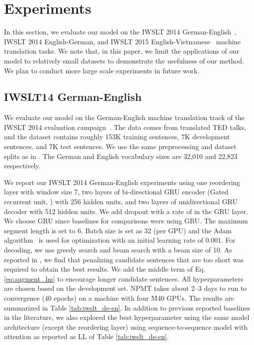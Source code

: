 \documentclass{article}
\begin{document}
\section{Experiments}
\label{sec:experiment}

In this section, we evaluate our model on the IWSLT 2014
German-English~\citep{cettolo2014report}, IWSLT 2014 English-German, and IWSLT 2015
English-Vietnamese~\citep{cettolo2015iwslt} machine translation tasks. We note that, in this paper, we
limit the applications of our model to relatively small datasets to demonstrate
the usefulness of our method. We plan to conduct more large scale experiments in
future work.


\subsection{IWSLT14 German-English}
\label{sec:iwslt_de-en}
We evaluate our model on the German-English machine translation track of the IWSLT 2014
evaluation campaign~\citep{cettolo2014report}.
The data comes from translated TED talks, and the dataset contains
roughly 153K training sentences, 7K development sentences, and 7K test
sentences. We use the same preprocessing and dataset splits as in
\citet{DBLP:journals/corr/RanzatoCAZ15,
wiseman2016sequence,Bahdanau2016}. 
The German and English vocabulary sizes are 32,010 and 22,823 respectively.

We report our IWSLT 2014 German-English experiments using one reordering layer
with window size 7, two layers of bi-directional GRU encoder (Gated recurrent unit,
\cite{Chung:2014}) with 256 hidden units, and two layers of unidirectional GRU decoder
with 512 hidden units.  We add dropout with a rate of  in the GRU layer.
We choose GRU since baselines for comparisons were using GRU.  The maximum
segment length is set to 6.  Batch size is set as 32 (per GPU) and the Adam
algorithm~\citep{kingma2014adam} is used for optimization with an initial learning
rate of 0.001.  For decoding, we use greedy search and beam search with a beam
size of 10.  As reported in \citet{bd_rnn_asr,Bahdanau2016}, we find that
penalizing candidate sentences that are too short was required to obtain the
best results. 
We add the middle term of Eq. \eqref{eq:augment_lm} to encourage longer candidate sentences.
All hyperparameters are chosen based on the development set. NPMT takes about 2--3
days to run to convergence (40 epochs) on a machine with four M40 GPUs. The results are summarized
in Table \ref{tab:iwslt_de-en}.  In addition to previous reported baselines in
the literature, we also explored the best hyperparameter using the same model
architecture (except the reordering layer) using sequence-to-sequence model with
attention as reported as LL of Table \ref{tab:iwslt_de-en}. 
\end{document}
